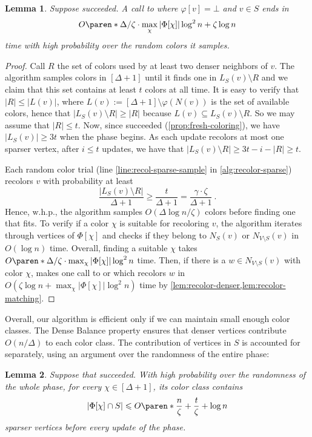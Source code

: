 \documentclass[a4paper,english,11pt]{amsart}
\newtheorem{lemma}{Lemma}[section]
\theoremstyle{definition}
\renewcommand{\leq}{\leqslant}
\renewcommand{\geq}{\geqslant}
\DeclarePairedDelimiter{\paren}()
\newcommand{\whp}{$\text{w.h.p.}$\xspace}
\newcommand{\col}{\varphi}
\newcommand{\NS}{N_{S}}
\newcommand{\ND}{N_{V\setminus S}}
\newcommand{\LS}{L_{S}}
\begin{document}
\begin{lemma}
    \label{cor:recolor-sparse-time}
    Suppose \FreshColoring succeeded.
    A call to  where $\col[v]=\bot$ and $v\in S$ ends in
    \[
    O\paren*{
        \Delta / \zeta \cdot \max_{\chi} |\Phi[\chi]| \log^2 n +
        \zeta\log n
    }
    \] time with high probability over the random colors it samples.
\end{lemma}
\begin{proof}
    Call $R$ the set of colors used by at least two denser neighbors of $v$. The algorithm samples colors in $[\Delta+1]$ until it finds one in $\LS(v) \setminus R$ and we claim that this set contains at least $t$ colors at all time. It is easy to verify that $|R| \leq |L(v)|$, where $L(v) := [\Delta+1]\setminus\col(N(v))$ is the set of available colors, hence that $|\LS(v) \setminus R| \geq |R|$ because $L(v) \subseteq \LS(v) \setminus R$. So we may assume that $|R| \leq t$. Now, since \FreshColoring succeeded (\cref{prop:fresh-coloring}), we have $|\LS(v)| \geq 3t$ when the phase begins. As each update recolors at most one sparser vertex, after $i \leq t$ updates, we have that $|\LS(v) \setminus R| \geq 3t - i - |R| \geq t$.

    Each random color trial (line \ref{line:recol-sparse-sample} in \cref{alg:recolor-sparse}) recolors $v$ with probability at least \[ \frac{|\LS(v) \setminus R|}{\Delta+1} \geq \frac{ t }{\Delta+1} = \frac{ \gamma \cdot \zeta }{\Delta+1} \ . \] Hence, \whp, the algorithm samples $O(\Delta \log n / \zeta)$ colors before finding one that fits. To verify if a color $\chi$ is suitable for recoloring $v$, the algorithm iterates through vertices of $\Phi[\chi]$ and checks if they belong to $\NS(v)$ or $\ND(v)$ in $O(\log n)$ time. Overall, finding a suitable $\chi$ takes $O\paren*{ \Delta / \zeta \cdot \max_{\chi} |\Phi[\chi]| \log^2n }$ time. Then, if there is a $w \in \ND(v)$ with color $\chi$, \RecolorSparse makes one call to  or  which recolors $w$ in $O(\zeta \log n + \max_\chi |\Phi[\chi]|\log^2n)$ time by \cref{lem:recolor-denser,lem:recolor-matching}.
\end{proof}

Overall, our algorithm is efficient only if we can maintain small enough color classes. The Dense Balance property ensures that denser vertices contribute $O(n/\Delta)$ to each color class. The contribution of vertices in $S$ is accounted for separately, using an argument over the randomness of the entire phase:
\begin{lemma}
    \label{lemma:dyn-sparse-balance}
    Suppose that \FreshColoring succeeded. With high probability \emph{over the randomness of the whole phase}, for every $\chi \in[\Delta+1]$, its color class contains
    \begin{equation}
        \label{eq:sparse-balance}
    | \Phi[\chi] \cap S |
    \leq O\paren*{ \frac{n}{\zeta} + \frac{t}{\zeta} + \log n }
    \end{equation}
    sparser vertices before every update of the phase.
\end{lemma}
\end{document}
